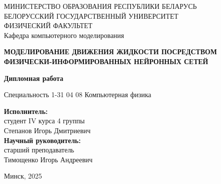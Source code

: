 \thispagestyle{empty}

\begin{center}
	МИНИСТЕРСТВО ОБРАЗОВАНИЯ РЕСПУБЛИКИ БЕЛАРУСЬ \\ 
	БЕЛОРУССКИЙ ГОСУДАРСТВЕННЫЙ УНИВЕРСИТЕТ \\ 
	ФИЗИЧЕСКИЙ ФАКУЛЬТЕТ \\
	Кафедра компьютерного моделирования
\end{center}

\vspace{100pt}

\begin{center}
	\textbf{МОДЕЛИРОВАНИЕ ДВИЖЕНИЯ ЖИДКОСТИ ПОСРЕДСТВОМ ФИЗИЧЕСКИ-ИНФОРМИРОВАННЫХ НЕЙРОННЫХ СЕТЕЙ}
	
	\hspace{10mm}
	\textbf{Дипломная работа}
	\hspace{10mm}

	Специальность 1-31 04 08 Компьютерная физика
\end{center}

\vfill

\begin{flushright}
	\textbf{Исполнитель:} \\
	студент IV курса 4 группы \\
	Степанов Игорь Дмитриевич \\
	\vspace{10mm}
	\textbf{Научный руководитель:} \\
	старший преподаватель \\
	Тимощенко Игорь Андреевич
\end{flushright}

\vfill

\begin{center}
	Минск, 2025
\end{center}